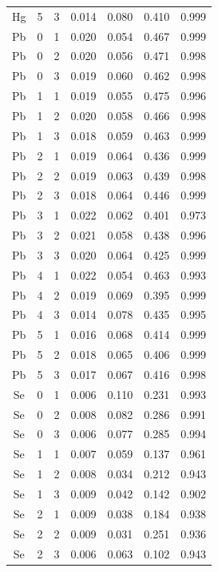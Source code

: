 \documentclass[ms, hidelinks]{uncgdissertationexp3}
\theoremstyle{plain}
\theoremstyle{definition}
\theoremstyle{remark}
\begin{document}
\begin{longtable}{ccccccc}
  Hg & 5 & 3 & 0.014 & 0.080 & 0.410 & 0.999\\
  \rowcolor{gray!6}  Pb & 0 & 1 & 0.020 & 0.054 & 0.467 & 0.999\\
  Pb & 0 & 2 & 0.020 & 0.056 & 0.471 & 0.998\\
  \rowcolor{gray!6}  Pb & 0 & 3 & 0.019 & 0.060 & 0.462 & 0.998\\
  Pb & 1 & 1 & 0.019 & 0.055 & 0.475 & 0.996\\
  \rowcolor{gray!6}  Pb & 1 & 2 & 0.020 & 0.058 & 0.466 & 0.998\\
  Pb & 1 & 3 & 0.018 & 0.059 & 0.463 & 0.999\\
  \rowcolor{gray!6}  Pb & 2 & 1 & 0.019 & 0.064 & 0.436 & 0.999\\
  Pb & 2 & 2 & 0.019 & 0.063 & 0.439 & 0.998\\
  \rowcolor{gray!6}  Pb & 2 & 3 & 0.018 & 0.064 & 0.446 & 0.999\\
  Pb & 3 & 1 & 0.022 & 0.062 & 0.401 & 0.973\\
  \rowcolor{gray!6}  Pb & 3 & 2 & 0.021 & 0.058 & 0.438 & 0.996\\
  Pb & 3 & 3 & 0.020 & 0.064 & 0.425 & 0.999\\
  \rowcolor{gray!6}  Pb & 4 & 1 & 0.022 & 0.054 & 0.463 & 0.993\\
  Pb & 4 & 2 & 0.019 & 0.069 & 0.395 & 0.999\\
  \rowcolor{gray!6}  Pb & 4 & 3 & 0.014 & 0.078 & 0.435 & 0.995\\
  Pb & 5 & 1 & 0.016 & 0.068 & 0.414 & 0.999\\
  \rowcolor{gray!6}  Pb & 5 & 2 & 0.018 & 0.065 & 0.406 & 0.999\\
  Pb & 5 & 3 & 0.017 & 0.067 & 0.416 & 0.998\\
  \rowcolor{gray!6}  Se & 0 & 1 & 0.006 & 0.110 & 0.231 & 0.993\\
  Se & 0 & 2 & 0.008 & 0.082 & 0.286 & 0.991\\
  \rowcolor{gray!6}  Se & 0 & 3 & 0.006 & 0.077 & 0.285 & 0.994\\
  Se & 1 & 1 & 0.007 & 0.059 & 0.137 & 0.961\\
  \rowcolor{gray!6}  Se & 1 & 2 & 0.008 & 0.034 & 0.212 & 0.943\\
  Se & 1 & 3 & 0.009 & 0.042 & 0.142 & 0.902\\
  \rowcolor{gray!6}  Se & 2 & 1 & 0.009 & 0.038 & 0.184 & 0.938\\
  Se & 2 & 2 & 0.009 & 0.031 & 0.251 & 0.936\\
  \rowcolor{gray!6}  Se & 2 & 3 & 0.006 & 0.063 & 0.102 & 0.943\\

\end{longtable}
\end{document}
